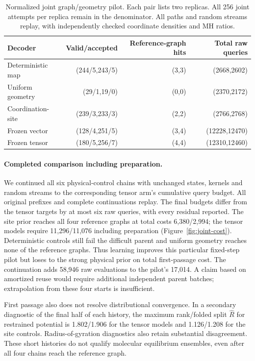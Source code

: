 \begin{table}[t]
\centering\small
\caption{Normalized joint graph/geometry pilot. Each pair lists two replicas.
All 256 joint attempts per replica remain in the denominator. All paths and random
streams replay, with independently checked coordinate densities and MH ratios.}
\label{tab:joint-first}
\begin{tabular}{lrrr}
\toprule
Decoder & Valid/accepted & Reference-graph hits & Total raw queries\\
\midrule
Deterministic map & (244/5,243/5) & (3,3) & (2668,2602)\\
Uniform geometry & (29/1,19/0) & (0,0) & (2370,2172)\\
Coordination-site & (239/3,233/3) & (2,2) & (2766,2768)\\
Frozen vector & (128/4,251/5) & (3,4) & (12228,12470)\\
Frozen tensor & (180/5,256/7) & (4,4) & (12310,12460)\\
\bottomrule
\end{tabular}
\end{table}

\paragraph{Completed comparison including preparation.}
We continued all six physical-control chains with unchanged states, kernels and
random streams to the corresponding tensor arm's cumulative query budget. All
original prefixes and complete continuations replay. The final budgets differ
from the tensor targets by at most six raw queries, with every residual reported.
The site prior reaches all four reference graphs at total costs 6,380/2,994;
the tensor models require 11,296/11,076 including preparation
(Figure~\ref{fig:joint-cost}). Deterministic controls still fail the difficult
parent and uniform geometry reaches none of the reference graphs. Thus learning
improves this particular fixed-step pilot but loses to the strong physical prior
on total first-passage cost. The continuation adds 58,946 raw evaluations to the
pilot's 17,014. A claim based on amortized reuse would require additional independent
parent batches; extrapolation from these four starts is insufficient.

First passage also does not resolve distributional convergence. In a secondary
diagnostic of the final half of each history, the maximum rank/folded split
$\widehat R$ for restrained potential is 1.802/1.906 for the tensor models and
1.126/1.208 for the site controls. Radius-of-gyration diagnostics also retain
substantial disagreement. These short histories do not qualify molecular
equilibrium ensembles, even after all four chains reach the reference graph.

